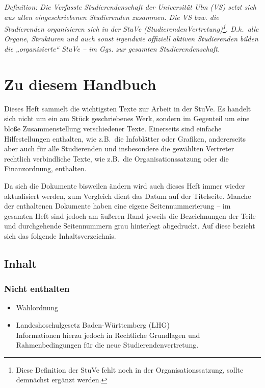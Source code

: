 

\textit{Definition: Die Verfasste Studierendenschaft der Universität Ulm (VS) setzt sich aus allen eingeschriebenen Studierenden zusammen. Die VS bzw. die Studierenden organisieren sich in der StuVe (StudierendenVertretung)\footnote{Diese Definition der StuVe fehlt noch in der Organisationssatzung, sollte demnächst ergänzt werden.}. D.h.\ alle Organe, Strukturen und auch sonst irgendwie offiziell aktiven Studierenden bilden die „organisierte“ StuVe – im Ggs. zur gesamten Studierendenschaft.}

\section*{Zu diesem Handbuch}


Dieses Heft sammelt die wichtigsten Texte zur Arbeit in der StuVe. Es handelt sich nicht um ein am Stück geschriebenes Werk, sondern im Gegenteil um eine bloße Zusammenstellung verschiedener Texte. Einerseits sind einfache Hilfestellungen enthalten, wie z.B.\ die Infoblätter oder Grafiken, andererseits aber auch für alle Studierenden und insbesondere die gewählten Vertreter rechtlich verbindliche Texte, wie z.B.\ die Organisationssatzung oder die Finanzordnung, enthalten.

Da sich die Dokumente bisweilen ändern wird auch dieses Heft immer wieder aktualisiert werden, zum Vergleich dient das Datum auf der Titelseite. Manche der enthaltenen Dokumente haben eine eigene Seitennummerierung – im gesamten Heft sind jedoch am äußeren Rand jeweils die Bezeichnungen der Teile und durchgehende Seitennummern grau hinterlegt abgedruckt. Auf diese bezieht sich das folgende Inhaltsverzeichnis.

\subsection*{Inhalt}


\toccontents

\subsubsection*{Nicht enthalten}
\begin{itemize}
	\item Wahlordnung
	\item Landeshoschulgesetz Baden-Württemberg (LHG)\\Informationen hierzu jedoch in Rechtliche Grundlagen und Rahmenbedingungen für die neue Studierendenvertretung.
\end{itemize}
